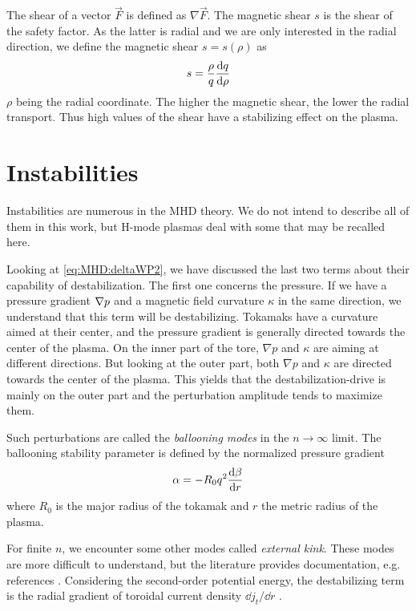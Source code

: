 The shear of a vector $\vec{F}$ is defined as $\nabla \vec{F}$. The magnetic shear $s$ is the shear of the safety factor. As the latter is radial and we are only interested in the radial direction, we define the magnetic shear $s = s(\rho)$ as
\begin{align*}
	s = \frac{\rho}{q} \dfrac{\textrm{d} q}{\textrm{d} \rho}
\end{align*}
$\rho$ being the radial coordinate. The higher the magnetic shear, the lower the radial transport. Thus high values of the shear have a stabilizing effect on the plasma.
\section{Instabilities}\label{sec:MHD:instab}
Instabilities are numerous in the MHD theory. We do not intend to describe all of them in this work, but H-mode plasmas deal with some that may be recalled here.

Looking at \eqref{eq:MHD:deltaWP2}, we have discussed the last two terms about their capability of destabilization. The first one concerns the pressure. If we have a pressure gradient $\nabla p$ and a magnetic field curvature $\kappa$ in the same direction, we understand that this term will be destabilizing. Tokamaks have a curvature aimed at their center, and the pressure gradient is generally directed towards the center of the plasma. On the inner part of the tore, $\nabla p$ and $\kappa$ are aiming at different directions. But looking at the outer part, both $\nabla p$ and $\kappa$ are directed towards the center of the plasma. This yields that the destabilization-drive is mainly on the outer part and the perturbation amplitude tends to maximize them.

Such perturbations are called the \emph{ballooning modes} in the $n \rightarrow \infty$ limit. The ballooning stability parameter is defined by the normalized pressure gradient
\begin{align*}
	\alpha = - R_0 q^2 \dfrac{\textrm{d} \beta}{\textrm{d} r}
\end{align*}
where $R_0$ is the major radius of the tokamak and $r$ the metric radius of the plasma.

For finite $n$, we encounter some other modes called \emph{external kink}. These modes are more difficult to understand, but the literature provides documentation, e.g. references \cite{wesson1978,lortz1975}. Considering the second-order potential energy, the destabilizing term is the radial gradient of toroidal current density $\dd j_t / \dd r$ \cite{wesson1978}.

